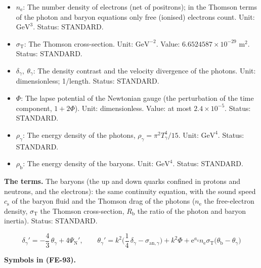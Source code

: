 \documentclass[
  10pt,
]{article}
\begin{document}
\begin{itemize}
  Value: 2.718281828. Status: STANDARD.
\item
  \(n_{\mathrm{e}}\): The number density of electrons (net of
  positrons); in the Thomson terms of the photon and baryon equations
  only free (ionised) electrons count. Unit: \(\mathrm{GeV}^{3}\).
  Status: STANDARD.
\item
  \(\sigma_{\mathrm{T}}\): The Thomson cross-section. Unit:
  \(\mathrm{GeV}^{-2}\). Value: \(6.6524587\times10^{-29}\) m\(^2\).
  Status: STANDARD.
\item
  \(\delta_\gamma,\ \theta_\gamma\): The density contrast and the
  velocity divergence of the photons. Unit: dimensionless; 1/length.
  Status: STANDARD.
\item
  \(\Phi\): The lapse potential of the Newtonian gauge (the perturbation
  of the time component, \(1 + 2\Phi\)). Unit: dimensionless. Value: at
  most \(2.4\times10^{-5}\). Status: STANDARD.
\item
  \(\rho_\gamma\): The energy density of the photons,
  \(\rho_\gamma = \pi^2T_\gamma^4/15\). Unit: \(\mathrm{GeV}^{4}\).
  Status: STANDARD.
\item
  \(\rho_{\mathrm{b}}\): The energy density of the baryons. Unit:
  \(\mathrm{GeV}^{4}\). Status: STANDARD.
\end{itemize}

\textbf{The terms.} The baryons (the up and down quarks confined in
protons and neutrons, and the electrons): the same continuity equation,
with the sound speed \(c_{\mathrm{s}}\) of the baryon fluid and the
Thomson drag of the photons (\(n_{\mathrm{e}}\) the free-electron
density, \(\sigma_{\mathrm{T}}\) the Thomson cross-section,
\(R_{\mathrm{b}}\) the ratio of the photon and baryon inertia). Status:
STANDARD.

\[
\delta_\gamma' = -\frac43\,\theta_\gamma + 4\Psi_{\mathrm{N}}',\qquad
\theta_\gamma' = k^2\Big(\frac14\,\delta_\gamma - \sigma_{\mathrm{an},\gamma}\Big) + k^2\Phi
 + \mathrm{e}^{a_4}n_{\mathrm{e}}\sigma_{\mathrm{T}}\big(\theta_{\mathrm{b}} - \theta_\gamma\big) \tag{FE-93}
\]

\textbf{Symbols in (FE-93).}
\end{document}
